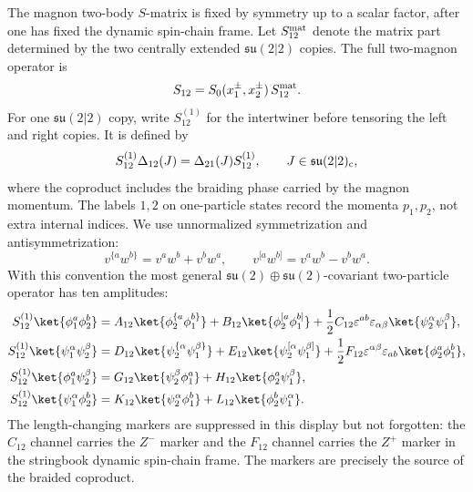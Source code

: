 The magnon two-body \(S\)-matrix is fixed by symmetry up to a scalar factor,
after one has fixed the dynamic spin-chain frame.  Let
\(S^{\rm mat}_{12}\) denote the matrix part determined by the two centrally
extended \(\mathfrak{su}(2|2)\) copies.  The full two-magnon operator is
\[
  S_{12}=S_0(x_1^\pm,x_2^\pm)\,S^{\rm mat}_{12}.
\]
For one \(\mathfrak{su}(2|2)\) copy, write \(S^{(1)}_{12}\) for the
intertwiner before tensoring the left and right copies.  It is defined by
\[
  S^{(1)}_{12}\Delta_{12}(J)
  =
  \Delta_{21}(J)S^{(1)}_{12},
  \qquad J\in\mathfrak{su}(2|2)_{\rm c},
\]
where the coproduct includes the braiding phase carried by the magnon momentum.
The labels \(1,2\) on one-particle states record the momenta \(p_1,p_2\), not
extra internal indices.  We use unnormalized symmetrization and
antisymmetrization:
\[
  v^{\{a}w^{b\}}=v^a w^b+v^b w^a,
  \qquad
  v^{[a}w^{b]}=v^a w^b-v^b w^a .
\]
With this convention the most general
\(\mathfrak{su}(2)\oplus\mathfrak{su}(2)\)-covariant two-particle operator has
ten amplitudes:
\[
\begin{aligned}
  S^{(1)}_{12}\ket{\phi_1^a\phi_2^b}
  &=
  A_{12}\ket{\phi_2^{\{a}\phi_1^{b\}}}
  +B_{12}\ket{\phi_2^{[a}\phi_1^{b]}}
  +\frac12 C_{12}\varepsilon^{ab}\varepsilon_{\alpha\beta}
    \ket{\psi_2^\alpha\psi_1^\beta},\\
  S^{(1)}_{12}\ket{\psi_1^\alpha\psi_2^\beta}
  &=
  D_{12}\ket{\psi_2^{\{\alpha}\psi_1^{\beta\}}}
  +E_{12}\ket{\psi_2^{[\alpha}\psi_1^{\beta]}}
  +\frac12 F_{12}\varepsilon^{\alpha\beta}\varepsilon_{ab}
    \ket{\phi_2^a\phi_1^b},\\
  S^{(1)}_{12}\ket{\phi_1^a\psi_2^\beta}
  &=
  G_{12}\ket{\psi_2^\beta\phi_1^a}
  +H_{12}\ket{\phi_2^a\psi_1^\beta},
  \\
  S^{(1)}_{12}\ket{\psi_1^\alpha\phi_2^b}
  &=
  K_{12}\ket{\psi_2^\alpha\phi_1^b}
  +L_{12}\ket{\phi_2^b\psi_1^\alpha}.
\end{aligned}
\]
The length-changing markers are suppressed in this display but not forgotten:
the \(C_{12}\) channel carries the \(Z^-\) marker and the \(F_{12}\) channel
carries the \(Z^+\) marker in the stringbook dynamic spin-chain frame.  The
markers are precisely the source of the braided coproduct.

